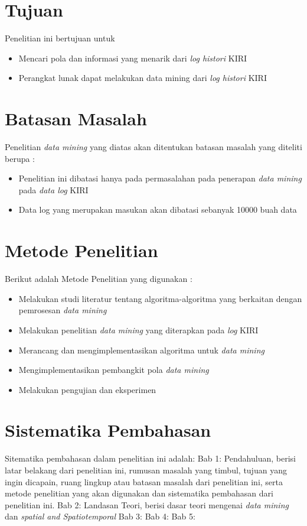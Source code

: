 \section{Tujuan}
Penelitian ini bertujuan untuk 
\begin{itemize}
	\item Mencari pola dan informasi yang menarik dari \textsl{log histori} KIRI
	\item Perangkat lunak dapat melakukan data mining dari \textsl{log histori} KIRI
\end{itemize}

\section{Batasan Masalah}
Penelitian \textsl{data mining} yang diatas akan ditentukan batasan masalah yang diteliti berupa : 
\begin{itemize}
	\item Penelitian ini dibatasi hanya pada permasalahan pada penerapan \textsl{data mining} pada \textsl{data log} KIRI
	\item Data log yang merupakan masukan akan dibatasi sebanyak 10000 buah data
\end{itemize}

\section{Metode Penelitian}
Berikut adalah Metode Penelitian yang digunakan : 
	\begin{itemize}
		\item Melakukan studi literatur tentang algoritma-algoritma yang berkaitan dengan pemrosesan \textsl{data mining}
		\item Melakukan penelitian \textsl{data mining} yang diterapkan pada \textsl{log} KIRI
		\item Merancang dan mengimplementasikan algoritma untuk \textsl{data mining}
		\item Mengimplementasikan pembangkit pola \textsl{data mining}
		\item Melakukan pengujian dan eksperimen
	\end{itemize}

\section{Sistematika Pembahasan}
Sitematika pembahasan dalam penelitian ini adalah:
Bab 1: Pendahuluan, berisi latar belakang dari penelitian ini, rumusan masalah yang timbul, tujuan yang ingin dicapain, ruang lingkup atau batasan masalah dari penelitian ini, serta metode penelitian yang akan digunakan dan sistematika pembahasan dari penelitian ini.
Bab 2: Landasan Teori, berisi dasar teori mengenai \textsl{data mining} dan \textsl{spatial and Spatiotemporal}
Bab 3:
Bab 4:
Bab 5: